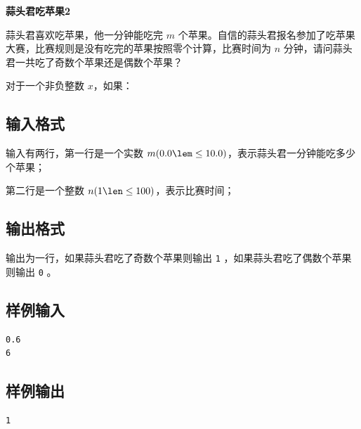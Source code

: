 \documentclass{article}
\newcommand{\problemname}[1]{\begin{center}\Large\bfseries #1\end{center}}
\begin{document}
\problemname{蒜头君吃苹果2}

蒜头君喜欢吃苹果，他一分钟能吃完 $m$ 个苹果。自信的蒜头君报名参加了吃苹果大赛，比赛规则是没有吃完的苹果按照零个计算，比赛时间为 $n$ 分钟，请问蒜头君一共吃了奇数个苹果还是偶数个苹果？

对于一个非负整数 $x$，如果：

\subsection*{输入格式}
输入有两行，第一行是一个实数 $m(0.0\lem\le10.0)$，表示蒜头君一分钟能吃多少个苹果；

第二行是一个整数 $n(1\len\le100)$，表示比赛时间；

\subsection*{输出格式}
输出为一行，如果蒜头君吃了奇数个苹果则输出 \texttt{1} ，如果蒜头君吃了偶数个苹果则输出 \texttt{0} 。

\subsection*{样例输入}
\begin{verbatim}
0.6
6
\end{verbatim}

\subsection*{样例输出}
\begin{verbatim}
1
\end{verbatim}
\end{document}

